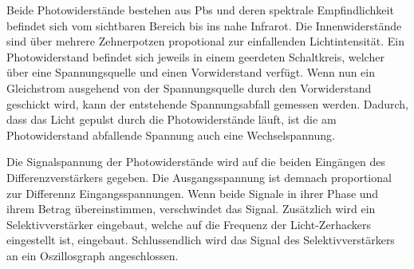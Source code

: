 Beide Photowiderstände bestehen aus Pbs und deren spektrale Empfindlichkeit befindet sich vom sichtbaren Bereich bis 
ins nahe Infrarot. Die Innenwiderstände sind über mehrere Zehnerpotzen propotional zur einfallenden
Lichtintensität. Ein Photowiderstand befindet sich jeweils in einem geerdeten Schaltkreis, welcher über eine Spannungsquelle 
und einen Vorwiderstand verfügt. Wenn nun ein Gleichstrom ausgehend von der Spannungsquelle durch den Vorwiderstand geschickt 
wird, kann der entstehende Spannungsabfall gemessen werden. Dadurch, dass das Licht gepulst durch die Photowiderstände läuft,
ist die am Photowiderstand abfallende Spannung auch eine Wechselspannung.

Die Signalspannung der Photowiderstände wird auf die beiden Eingängen des 
Differenzverstärkers gegeben. Die Ausgangsspannung ist demnach proportional zur Differennz Eingangsspannungen.
Wenn beide Signale in ihrer Phase und ihrem Betrag übereinstimmen, verschwindet das Signal.
Zusätzlich wird ein Selektivverstärker eingebaut, welche auf die Frequenz der Licht-Zerhackers eingestellt ist, eingebaut.
Schlussendlich wird das Signal des Selektivverstärkers an ein Oszillosgraph angeschlossen.

